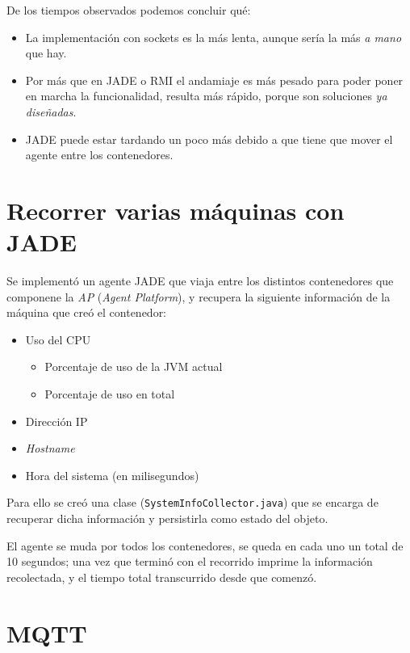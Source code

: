 De los tiempos observados podemos concluir qué:

\begin{itemize}
    \item La implementación con sockets es la más lenta, aunque sería la más \textit{a mano} que hay.
    \item Por más que en JADE o RMI el andamiaje es más pesado para poder poner en marcha la funcionalidad, resulta más rápido, porque son soluciones \textit{ya diseñadas}.
    \item JADE puede estar tardando un poco más debido a que tiene que mover el agente entre los contenedores. 
\end{itemize}

\section{Recorrer varias máquinas con JADE}

Se implementó un agente JADE que viaja entre los distintos contenedores que componene la \emph{AP} (\emph{Agent Platform}), y recupera la siguiente información de la máquina que creó el contenedor:

\begin{itemize}
    \item Uso del CPU
    \begin{itemize}
        \item Porcentaje de uso de la JVM actual
        \item Porcentaje de uso en total
    \end{itemize}
    \item Dirección IP
    \item \emph{Hostname} 
    \item Hora del sistema (en milisegundos)
\end{itemize}

Para ello se creó una clase (\texttt{SystemInfoCollector.java}) que se encarga de recuperar dicha información y persistirla como estado del objeto.

El agente se muda por todos los contenedores, se queda en cada uno un total de 10 segundos; una vez que terminó con el recorrido imprime la información recolectada, y el tiempo total transcurrido desde que comenzó.

\section{MQTT}





\clearpage
\printbibliography



